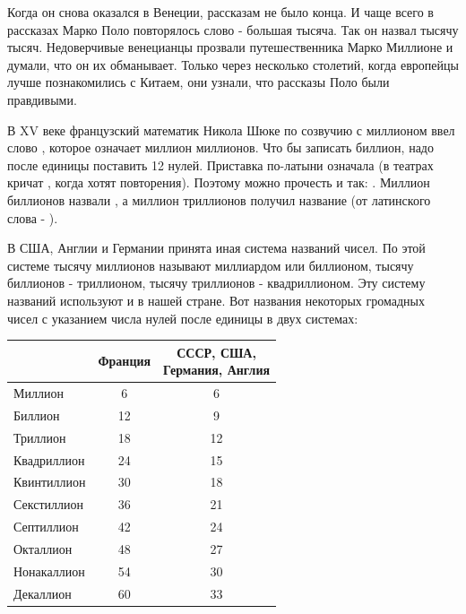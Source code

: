 \begin{multicols}{2}
Когда он снова оказался в Венеции, рассказам не было конца. И чаще всего в рассказах Марко Поло повторялось слово  - большая тысяча. Так он назвал тысячу тысяч. Недоверчивые венецианцы прозвали путешественника Марко Миллионе и думали, что он их обманывает. Только через несколько столетий, когда европейцы лучше познакомились с Китаем, они узнали, что рассказы Поло были правдивыми.

В XV веке французский математик Никола Шюке по созвучию с миллионом ввел слово , которое означает миллион миллионов. Что бы записать биллион, надо после единицы поставить 12 нулей. Приставка  по-латыни означала  (в театрах кричат , когда хотят повторения). Поэтому  можно прочесть и так: . Миллион биллионов назвали , а миллион триллионов получил название  (от латинского слова  - ).

В США, Англии и Германии принята иная система названий чисел. По этой системе тысячу миллионов называют миллиардом или биллионом, тысячу биллионов - триллионом, тысячу триллионов - квадриллионом. Эту систему названий используют и в нашей стране. Вот названия некоторых громадных чисел с указанием числа нулей после единицы в двух системах:


\begin{table}[H]
    \centering
    \begin{tabular}{|l|c|c|}
         \hline
         \; & Франция & \thead{СССР, США, \\ Германия, Англия} \\
         \hline
         Миллион     & 6  & 6  \\
         Биллион     & 12 & 9  \\
         Триллион    & 18 & 12 \\
         Квадриллион & 24 & 15 \\
         Квинтиллион & 30 & 18 \\
         Секстиллион & 36 & 21 \\
         Септиллион  & 42 & 24 \\
         Окталлион   & 48 & 27 \\
         Нонакаллион & 54 & 30 \\
         Декаллион   & 60 & 33 \\
         \hline
    \end{tabular}
    \label{tab:millions_table}
\end{table}


\end{multicols}

